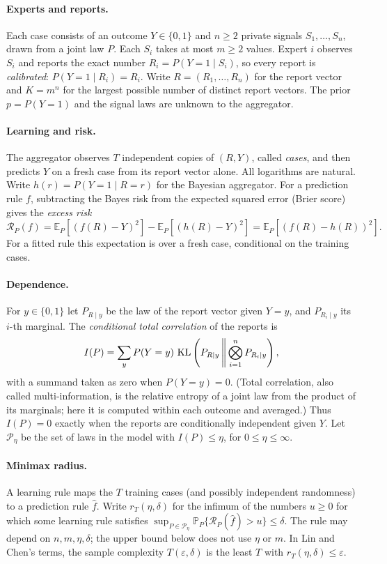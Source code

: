 \documentclass[11pt,a4paper]{article}
\theoremstyle{remark}
\newcommand{\KL}{\mathop{\rm KL}\nolimits}
\newcommand{\E}{\mathbb E}
\newcommand{\PP}{\mathbb P}
\newcommand{\cR}{\mathcal R}
\newcommand{\eps}{\varepsilon}
\begin{document}
\paragraph{Experts and reports.}
Each case consists of an outcome $Y\in\{0,1\}$ and $n\ge2$ private signals $S_1,\ldots,S_n$, drawn from a joint law $P$. Each $S_i$ takes at most $m\ge2$ values. Expert $i$ observes $S_i$ and reports the exact number $R_i=P(Y=1\mid S_i)$, so every report is \emph{calibrated}: $P(Y=1\mid R_i)=R_i$. Write $R=(R_1,\ldots,R_n)$ for the report vector and $K=m^n$ for the largest possible number of distinct report vectors. The prior $p=P(Y=1)$ and the signal laws are unknown to the aggregator.

\paragraph{Learning and risk.}
The aggregator observes $T$ independent copies of $(R,Y)$, called \emph{cases}, and then predicts $Y$ on a fresh case from its report vector alone. All logarithms are natural. Write $h(r)=P(Y=1\mid R=r)$ for the Bayesian aggregator. For a prediction rule $f$, subtracting the Bayes risk from the expected squared error (Brier score) gives the \emph{excess risk}
\[
 \cR_P(f)=\E_P[(f(R)-Y)^2]-\E_P[(h(R)-Y)^2]=\E_P[(f(R)-h(R))^2].
\]
For a fitted rule this expectation is over a fresh case, conditional on the training cases.

\paragraph{Dependence.}
For $y\in\{0,1\}$ let $P_{R\mid y}$ be the law of the report vector given $Y=y$, and $P_{R_i\mid y}$ its $i$-th marginal. The \emph{conditional total correlation} of the reports is
\[
 I(P)=\sum_{y}P(Y=y)\,\KL\left(P_{R\mid y}\,\middle\|\,\bigotimes_{i=1}^n P_{R_i\mid y}\right),
\]
with a summand taken as zero when $P(Y=y)=0$. (Total correlation, also called multi-information, is the relative entropy of a joint law from the product of its marginals; here it is computed within each outcome and averaged.) Thus $I(P)=0$ exactly when the reports are conditionally independent given $Y$. Let $\mathcal P_\eta$ be the set of laws in the model with $I(P)\le\eta$, for $0\le\eta\le\infty$.

\paragraph{Minimax radius.}
A learning rule maps the $T$ training cases (and possibly independent randomness) to a prediction rule $\widehat f$. Write $r_T(\eta,\delta)$ for the infimum of the numbers $u\ge0$ for which some learning rule satisfies
$\sup_{P\in\mathcal P_\eta}\PP_P\{\cR_P(\widehat f)>u\}\le\delta$. The rule may depend on $n,m,\eta,\delta$; the upper bound below does not use $\eta$ or $m$. In Lin and Chen's terms, the sample complexity $T(\eps,\delta)$ is the least $T$ with $r_T(\eta,\delta)\le\eps$.
\end{document}
